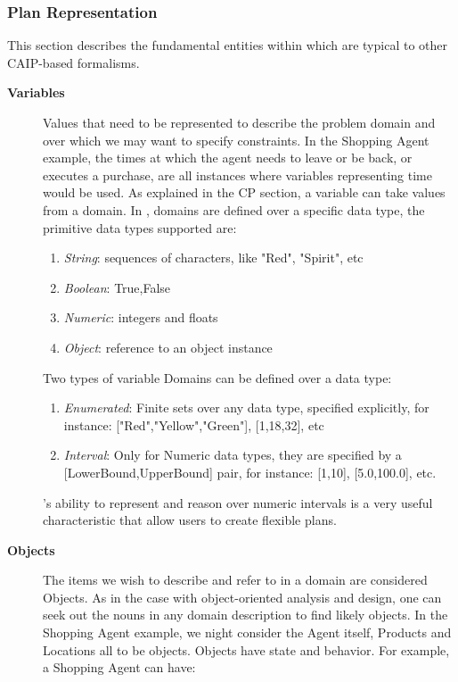 \subsubsection{\eu Plan Representation}
\label{sec:europa:pr}

This section describes the fundamental entities within \eu which are
typical to other CAIP-based formalisms.

\begin{description}

\item[\textbf{Variables}] Values that need to be represented to
  describe the problem domain and over which we may want to specify
  constraints. In the Shopping Agent example, the times at which the
  agent needs to leave or be back, or executes a purchase, are all
  instances where variables representing time would be used. 
  As explained in the CP section, a variable can take values from a domain. In \eu, domains are defined over a specific data type, the primitive data types supported are:
  \begin{enumerate}
    \item \textit{String}: sequences of characters, like "Red", "Spirit", etc 
    \item \textit{Boolean}: {True,False}
    \item \textit{Numeric}: integers and floats
    \item \textit{Object}: reference to an object instance
  \end {enumerate}
  Two types of variable Domains can be defined over a data type: 
  \begin{enumerate}
    \item \textit{Enumerated}: Finite sets over any data type, specified explicitly, for instance: ["Red","Yellow","Green"], [1,18,32], etc
    \item \textit{Interval}: Only for Numeric data types, they are specified by a [LowerBound,UpperBound] pair, for instance: [1,10], [5.0,100.0], etc.
  \end {enumerate}
  \eu's ability to represent and reason over numeric intervals is a very useful characteristic that allow users to create flexible plans. 

\item[\textbf{Objects}] The items we wish to describe and refer to in
  a domain are considered Objects. As in the case with object-oriented
  analysis and design, one can seek out the nouns in any domain
  description to find likely objects. In the Shopping Agent example,
  we night consider the Agent itself, Products and Locations all to be
  objects. Objects have state and behavior. For example, a Shopping
  Agent can have:


\end{description}

